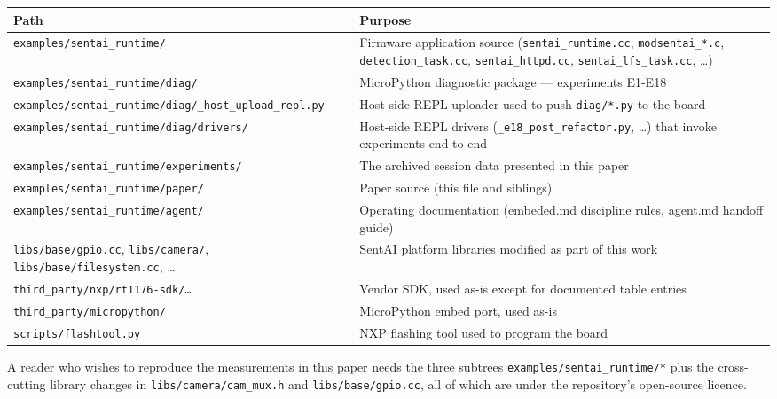 {\def\LTcaptype{none} %
\begin{longtable}[]{@{}
  >{\raggedright\arraybackslash}p{}
  >{\raggedright\arraybackslash}p{}@{}}
\toprule\noalign{}
\begin{minipage}[b]{\linewidth}\raggedright
Path
\end{minipage} & \begin{minipage}[b]{\linewidth}\raggedright
Purpose
\end{minipage} \\
\midrule\noalign{}
\endhead
\bottomrule\noalign{}
\endlastfoot
\texttt{examples/sentai\_runtime/} & Firmware application source
(\texttt{sentai\_runtime.cc}, \texttt{modsentai\_*.c},
\texttt{detection\_task.cc}, \texttt{sentai\_httpd.cc},
\texttt{sentai\_lfs\_task.cc}, \ldots) \\
\texttt{examples/sentai\_runtime/diag/} & MicroPython diagnostic package
--- experiments E1-E18 \\
\texttt{examples/sentai\_runtime/diag/\_host\_upload\_repl.py} &
Host-side REPL uploader used to push \texttt{diag/*.py} to the board \\
\texttt{examples/sentai\_runtime/diag/drivers/} & Host-side REPL drivers
(\texttt{\_e18\_post\_refactor.py}, \ldots) that invoke experiments
end-to-end \\
\texttt{examples/sentai\_runtime/experiments/} & The archived session
data presented in this paper \\
\texttt{examples/sentai\_runtime/paper/} & Paper source (this file and
siblings) \\
\texttt{examples/sentai\_runtime/agent/} & Operating documentation
(embeded.md discipline rules, agent.md handoff guide) \\
\texttt{libs/base/gpio.cc}, \texttt{libs/camera/},
\texttt{libs/base/filesystem.cc}, \ldots{} & SentAI platform libraries
modified as part of this work \\
\texttt{third\_party/nxp/rt1176-sdk/…} & Vendor SDK, used as-is except
for documented table entries \\
\texttt{third\_party/micropython/} & MicroPython embed port, used
as-is \\
\texttt{scripts/flashtool.py} & NXP flashing tool used to program the
board \\
\end{longtable}
}

A reader who wishes to reproduce the measurements in this paper needs
the three subtrees \texttt{examples/sentai\_runtime/*} plus the
cross-cutting library changes in \texttt{libs/camera/cam\_mux.h} and
\texttt{libs/base/gpio.cc}, all of which are under the repository's
open-source licence.

